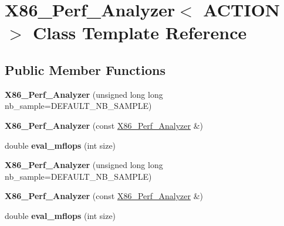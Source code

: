 \hypertarget{class_x86___perf___analyzer}{}\section{X86\+\_\+\+Perf\+\_\+\+Analyzer$<$ A\+C\+T\+I\+ON $>$ Class Template Reference}
\label{class_x86___perf___analyzer}
\subsection*{Public Member Functions}
\begin{DoxyCompactItemize}
\item 
\mbox{\label{class_x86___perf___analyzer_af1533306a3cb07ce9a7e82f89dc73ef3}} 
{\bfseries X86\+\_\+\+Perf\+\_\+\+Analyzer} (unsigned long long nb\+\_\+sample=D\+E\+F\+A\+U\+L\+T\+\_\+\+N\+B\+\_\+\+S\+A\+M\+P\+LE)
\item 
\mbox{\label{class_x86___perf___analyzer_a2c18355727c464731ec41d9633cb7cfa}} 
{\bfseries X86\+\_\+\+Perf\+\_\+\+Analyzer} (const \hyperlink{class_x86___perf___analyzer}{X86\+\_\+\+Perf\+\_\+\+Analyzer} \&)
\item 
\mbox{\label{class_x86___perf___analyzer_ae0dba1a6695ad0fd11610d38d8429ee4}} 
double {\bfseries eval\+\_\+mflops} (int size)
\item 
\mbox{\label{class_x86___perf___analyzer_af1533306a3cb07ce9a7e82f89dc73ef3}} 
{\bfseries X86\+\_\+\+Perf\+\_\+\+Analyzer} (unsigned long long nb\+\_\+sample=D\+E\+F\+A\+U\+L\+T\+\_\+\+N\+B\+\_\+\+S\+A\+M\+P\+LE)
\item 
\mbox{\label{class_x86___perf___analyzer_a2c18355727c464731ec41d9633cb7cfa}} 
{\bfseries X86\+\_\+\+Perf\+\_\+\+Analyzer} (const \hyperlink{class_x86___perf___analyzer}{X86\+\_\+\+Perf\+\_\+\+Analyzer} \&)
\item 
\mbox{\label{class_x86___perf___analyzer_ae0dba1a6695ad0fd11610d38d8429ee4}} 
double {\bfseries eval\+\_\+mflops} (int size)
\end{DoxyCompactItemize}


